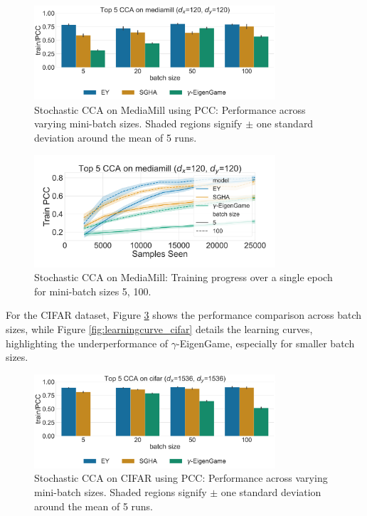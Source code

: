 \begin{figure}
    \centering
    \includegraphics[width=0.8\textwidth]{figures/CCA/mediamill_models_different_batch_sizes}
    \caption{Stochastic CCA on MediaMill using PCC: Performance across varying mini-batch sizes. Shaded regions signify \(\pm\) one standard deviation around the mean of 5 runs.}
    \label{fig:corr_mediamill}
\end{figure}

\begin{figure}
    \centering
    \includegraphics[width=0.8\textwidth]{figures/CCA/mediamill_allbatchsizes_pcc}
    \caption{Stochastic CCA on MediaMill: Training progress over a single epoch for mini-batch sizes 5, 100.}
    \label{fig:learningcurve_mediamill}
\end{figure}

For the CIFAR dataset, Figure \ref{fig:corr_cifar} shows the performance comparison across batch sizes, while Figure \ref{fig:learningcurve_cifar} details the learning curves, highlighting the underperformance of $\gamma$-EigenGame, especially for smaller batch sizes.

\begin{figure}
    \centering
    \includegraphics[width=0.8\textwidth]{figures/CCA/cifar_models_different_batch_sizes}
    \caption{Stochastic CCA on CIFAR using PCC: Performance across varying mini-batch sizes. Shaded regions signify \(\pm\) one standard deviation around the mean of 5 runs.}
    \label{fig:corr_cifar}
\end{figure}

